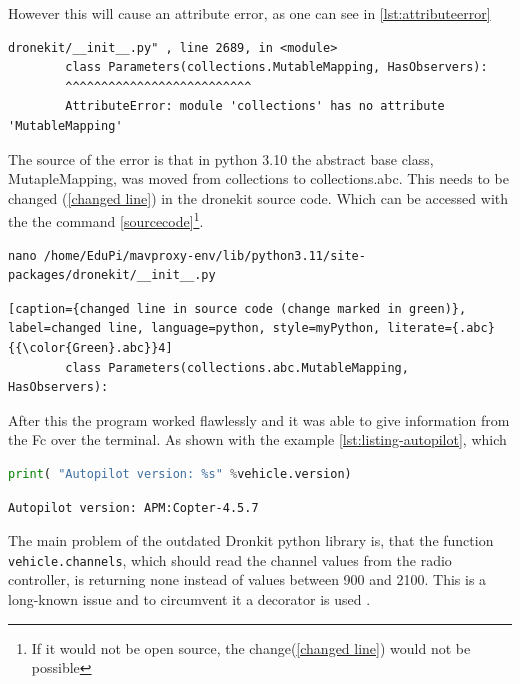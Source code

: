 \documentclass[svgnames]{article}
\begin{document}
	However this will cause an attribute error, as one can see in \cref{lst:attributeerror} 
	\begin{lstlisting}[label=lst:attributeerror, caption={AttributeError after connecting}]
		dronekit/__init__.py" , line 2689, in <module>
		class Parameters(collections.MutableMapping, HasObservers):
		^^^^^^^^^^^^^^^^^^^^^^^^^^
		AttributeError: module 'collections' has no attribute 'MutableMapping'
\end{lstlisting}
	The source of the error is that in python 3.10 the abstract base class, MutapleMapping, was moved from collections to collections.abc. This needs to be changed (\cref{changed line}) in the dronekit source code. Which can be accessed with the the command \cref{sourcecode}\footnote{If it would not be open source, the change(\cref{changed line}) would not be possible}.
	
	\begin{lstlisting}[caption= accessing source code, label=sourcecode]
nano /home/EduPi/mavproxy-env/lib/python3.11/site-packages/dronekit/__init__.py
\end{lstlisting}

	\begin{lstlisting}[caption={changed line in source code (change marked in green)}, label=changed line, language=python, style=myPython, literate={.abc}{{\color{Green}.abc}}4]
		class Parameters(collections.abc.MutableMapping, HasObservers):
	\end{lstlisting}
	
	After this the program worked flawlessly and it was able to give information from the \gls{Fc} over the terminal. As shown with the example \cref{lst:listing-autopilot}, which 
	
	\begin{lstlisting}[language=python, caption={information retrieval}, label=lst:listing-autopilot, style=myPython]
		print( "Autopilot version: %s" %vehicle.version)
	\end{lstlisting}
	\begin{lstlisting}[caption= output from \cref{lst:listing-autopilot}]
		Autopilot version: APM:Copter-4.5.7
	\end{lstlisting}

	The main problem of the outdated Dronkit python library is, that the function \lstinline|vehicle.channels|, which should read the channel values from the radio controller, is returning none instead of values between 900 and 2100. This is a long-known issue and to circumvent it a decorator is used \cite{rcchannelissue}. 
\end{document}

